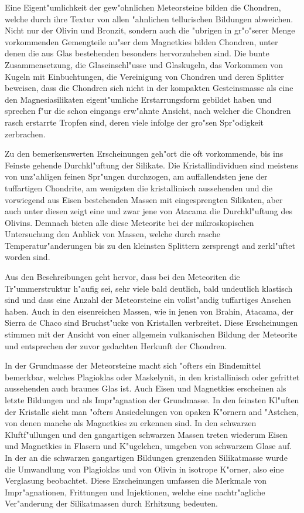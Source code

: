 \documentclass[a4paper, 11pt, oneside, polutonikogreek, german]{article}
\begin{document}
Eine Eigent"umlichkeit der gew"ohnlichen Meteorsteine bilden die Chondren, welche durch ihre Textur von allen "ahnlichen tellurischen Bildungen abweichen. Nicht nur der Olivin und Bronzit, sondern auch die "ubrigen in gr"o"serer Menge vorkommenden Gemengteile au"ser dem Magnetkies bilden Chondren, unter denen die aus Glas bestehenden besonders hervorzuheben sind. Die bunte Zusammensetzung, die Glaseinschl"usse und Glaskugeln, das Vorkommen von Kugeln mit Einbuchtungen, die Vereinigung von Chondren und deren Splitter beweisen, dass die Chondren sich nicht in der kompakten Gesteinsmasse als eine den Magnesiasilikaten eigent"umliche Erstarrungsform gebildet haben und sprechen f"ur die schon eingangs erw"ahnte Ansicht, nach welcher die Chondren rasch erstarrte Tropfen sind, deren viele infolge der gro"sen Spr"odigkeit zerbrachen.

Zu den bemerkenswerten Erscheinungen geh"ort die oft vorkommende, bis ins Feinste gehende Durchkl"uftung der Silikate. Die Kristallindividuen sind meistens von unz"ahligen feinen Spr"ungen durchzogen, am auffallendsten jene der tuffartigen Chondrite, am wenigsten die kristallinisch aussehenden und die vorwiegend aus Eisen bestehenden Massen mit eingesprengten Silikaten, aber auch unter diesen zeigt eine und zwar jene von Atacama die Durchkl"uftung des Olivins. Demnach bieten alle diese Meteorite bei der mikroskopischen Untersuchung den Anblick von Massen, welche durch rasche Temperatur"anderungen bis zu den kleinsten Splittern zersprengt and zerkl"uftet worden sind.

Aus den Beschreibungen geht hervor, dass bei den Meteoriten die Tr"ummerstruktur h"aufig sei, sehr viele bald deutlich, bald undeutlich klastisch sind und dass eine Anzahl der Meteorsteine ein vollst"andig tuffartiges Ansehen haben. Auch in den eisenreichen Massen, wie in jenen von Brahin, Atacama, der Sierra de Chaco sind Bruchst"ucke von Kristallen verbreitet. Diese Erscheinungen stimmen mit der Ansicht von einer allgemein vulkanischen Bildung der Meteorite und entsprechen der zuvor gedachten Herkunft der Chondren.

In der Grundmasse der Meteorsteine macht sich "ofters ein Bindemittel bemerkbar, welches Plagioklas oder Maskelynit, in den kristallinisch oder gefrittet aussehenden auch braunes Glas ist. Auch Eisen und Magnetkies erscheinen als letzte Bildungen und als Impr"agnation der Grundmasse. In den feinsten Kl"uften der Kristalle sieht man "ofters Ansiedelungen von opaken K"ornern and "Astchen, von denen manche als Magnetkies zu erkennen sind. In den schwarzen Kluftf"ullungen und den gangartigen schwarzen Massen treten wiederum Eisen und Magnetkies in Flasern und K"ugelchen, umgeben von schwarzem Glase auf. In der an die schwarzen gangartigen Bildungen grenzenden Silikatmasse wurde die Umwandlung von Plagioklas und von Olivin in isotrope K"orner, also eine Verglasung beobachtet. Diese Erscheinungen umfassen die Merkmale von Impr"agnationen, Frittungen und Injektionen, welche eine nachtr"agliche Ver"anderung der Silikatmassen durch Erhitzung bedeuten.
\end{document}
